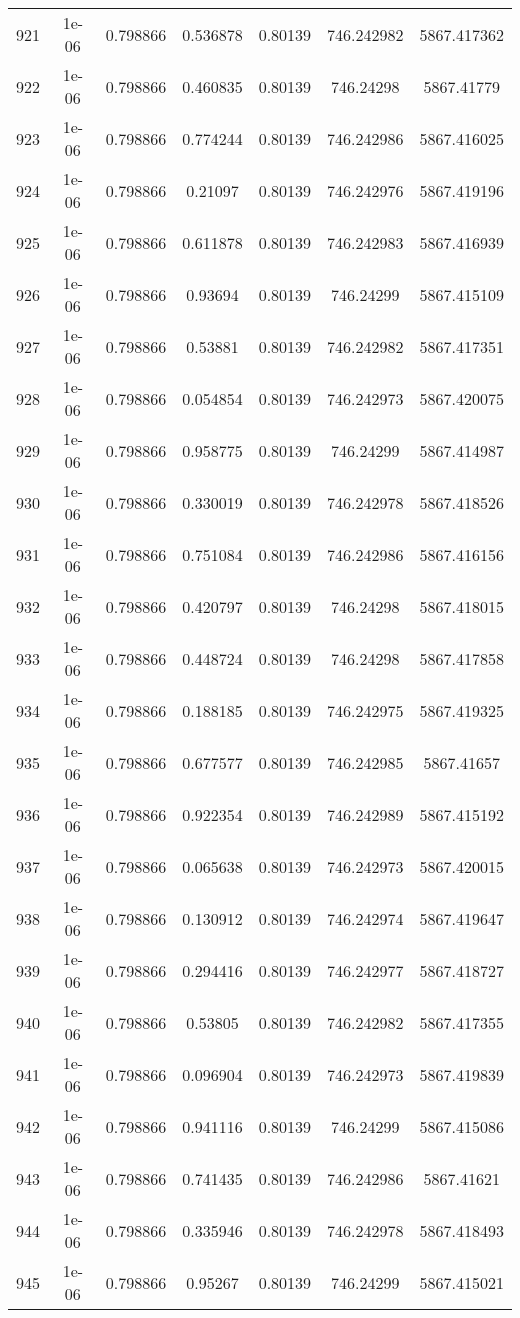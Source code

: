 \begin{table}
\begin{tabular*}{\linewidth}{c|c|c|c|c|c|c}
921 & 1e-06 & 0.798866 & 0.536878 & 0.80139 & 746.242982 & 5867.417362\\
922 & 1e-06 & 0.798866 & 0.460835 & 0.80139 & 746.24298 & 5867.41779\\
923 & 1e-06 & 0.798866 & 0.774244 & 0.80139 & 746.242986 & 5867.416025\\
924 & 1e-06 & 0.798866 & 0.21097 & 0.80139 & 746.242976 & 5867.419196\\
925 & 1e-06 & 0.798866 & 0.611878 & 0.80139 & 746.242983 & 5867.416939\\
926 & 1e-06 & 0.798866 & 0.93694 & 0.80139 & 746.24299 & 5867.415109\\
927 & 1e-06 & 0.798866 & 0.53881 & 0.80139 & 746.242982 & 5867.417351\\
928 & 1e-06 & 0.798866 & 0.054854 & 0.80139 & 746.242973 & 5867.420075\\
929 & 1e-06 & 0.798866 & 0.958775 & 0.80139 & 746.24299 & 5867.414987\\
930 & 1e-06 & 0.798866 & 0.330019 & 0.80139 & 746.242978 & 5867.418526\\
931 & 1e-06 & 0.798866 & 0.751084 & 0.80139 & 746.242986 & 5867.416156\\
932 & 1e-06 & 0.798866 & 0.420797 & 0.80139 & 746.24298 & 5867.418015\\
933 & 1e-06 & 0.798866 & 0.448724 & 0.80139 & 746.24298 & 5867.417858\\
934 & 1e-06 & 0.798866 & 0.188185 & 0.80139 & 746.242975 & 5867.419325\\
935 & 1e-06 & 0.798866 & 0.677577 & 0.80139 & 746.242985 & 5867.41657\\
936 & 1e-06 & 0.798866 & 0.922354 & 0.80139 & 746.242989 & 5867.415192\\
937 & 1e-06 & 0.798866 & 0.065638 & 0.80139 & 746.242973 & 5867.420015\\
938 & 1e-06 & 0.798866 & 0.130912 & 0.80139 & 746.242974 & 5867.419647\\
939 & 1e-06 & 0.798866 & 0.294416 & 0.80139 & 746.242977 & 5867.418727\\
940 & 1e-06 & 0.798866 & 0.53805 & 0.80139 & 746.242982 & 5867.417355\\
941 & 1e-06 & 0.798866 & 0.096904 & 0.80139 & 746.242973 & 5867.419839\\
942 & 1e-06 & 0.798866 & 0.941116 & 0.80139 & 746.24299 & 5867.415086\\
943 & 1e-06 & 0.798866 & 0.741435 & 0.80139 & 746.242986 & 5867.41621\\
944 & 1e-06 & 0.798866 & 0.335946 & 0.80139 & 746.242978 & 5867.418493\\
945 & 1e-06 & 0.798866 & 0.95267 & 0.80139 & 746.24299 & 5867.415021\\
\end{tabular*}
\end{table}
